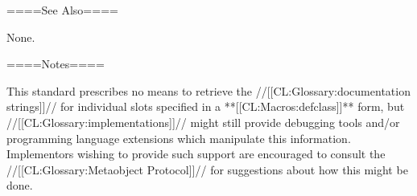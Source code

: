 ====See Also====

None.

====Notes====

This standard prescribes no means to retrieve the //[[CL:Glossary:documentation strings]]// for individual slots specified in a **[[CL:Macros:defclass]]** form, but //[[CL:Glossary:implementations]]// might still provide debugging tools and/or programming language extensions which manipulate this information. Implementors wishing to provide such support are encouraged to consult the //[[CL:Glossary:Metaobject Protocol]]// for suggestions about how this might be done.

    
